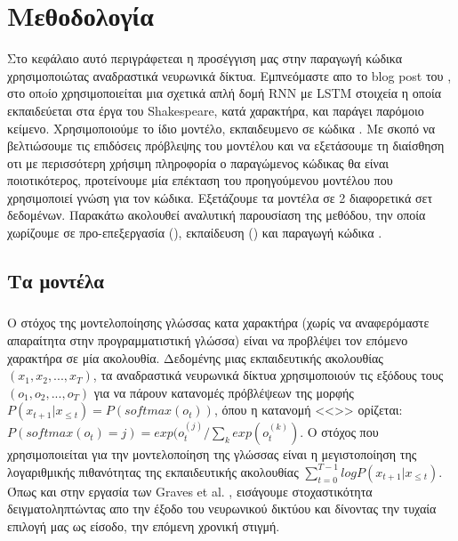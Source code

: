 \chapter{Μεθοδολογία}
Στο κεφάλαιο αυτό περιγράφετεαι η προσέγγιση μας στην παραγωγή κώδικα χρησιμοποιώτας αναδραστικά νευρωνικά δίκτυα.
Εμπνεόμαστε απο το blog post του , στο οπoίο χρησιμοποιείται μια σχετικά απλή δομή RNN με LSTM στοιχεία η οποία εκπαιδεύεται στα έργα του Shakespeare, κατά χαρακτήρα, και παράγει παρόμοιο κείμενο.
Χρησιμοποιούμε το ίδιο μοντέλο, εκπαιδευμενο σε κώδικα .
Με σκοπό να βελτιώσουμε τις επιδόσεις πρόβλεψης του μοντέλου και να εξετάσουμε τη διαίσθηση οτι με περισσότερη χρήσιμη πληροφορία ο παραγώμενος κώδικας θα είναι ποιοτικότερος, προτείνουμε μία επέκταση του προηγούμενου μοντέλου που χρησιμοποιεί  γνώση για τον κώδικα.
Εξετάζουμε τα μοντέλα σε 2 διαφορετικά σετ δεδομένων.
Παρακάτω ακολουθεί αναλυτική παρουσίαση της μεθόδου, την οποία χωρίζουμε σε προ-επεξεργασία (), εκπαίδευση () και παραγωγή κώδικα .

\section{Τα μοντέλα}

\subsection{}
Ο στόχος της μοντελοποίησης γλώσσας κατα χαρακτήρα (χωρίς να αναφερόμαστε απαραίτητα στην προγραμματιστική γλώσσα) είναι να προβλέψει τον επόμενο χαρακτήρα σε μία ακολουθία.
Δεδομένης μιας εκπαιδευτικής ακολουθίας $(x_1, x_2, ..., x_T)$, τα αναδραστικά νευρωνικά δίκτυα χρησιμοποιούν τις εξόδους τους $(ο_1, ο_2, ..., ο_T)$ για να πάρουν κατανομές πρόβλέψεων της μορφής $P(x_{t+1}|x_{\leq{t}}) = P(softmax(o_t))$, όπου η κατανομή <<>> ορίζεται: $P(softmax(o_t) = j) = exp(o_t^{(j)}/\sum_k exp(o_t^{(k)})$.
Ο στόχος που χρησιμοποιείται για την μοντελοποίηση της γλώσσας είναι η μεγιστοποίηση της λογαριθμικής πιθανότητας της εκπαιδευτικής ακολουθίας $\sum_{t=0}^{T-1}logP(x_{t+1}|x_{\leq{t}})$.
Όπως και στην εργασία των Graves et al. \cite{Graves2013}, εισάγουμε στοχαστικότητα δειγματοληπτώντας απο την έξοδο του νευρωνικού δικτύου και δίνοντας την τυχαία επιλογή μας ως είσοδο, την επόμενη χρονική στιγμή.

\subsection{}

